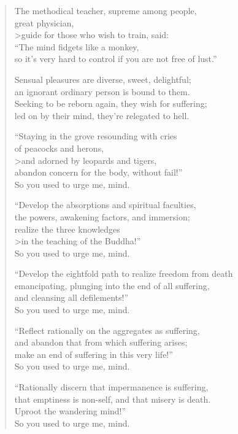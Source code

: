 \documentclass[12pt,openany]{book}%
\begin{document}
\begin{verse}
The methodical teacher, supreme among people, \\
great physician, \\>guide for those who wish to train, said: \\
“The mind fidgets like a monkey, \\
so it’s very hard to control if you are not free of lust.” 

Sensual pleasures are diverse, sweet, delightful; \\
an ignorant ordinary person is bound to them. \\
Seeking to be reborn again, they wish for suffering; \\
led on by their mind, they’re relegated to hell. 

“Staying in the grove resounding with cries \\
of peacocks and herons, \\>and adorned by leopards and tigers, \\
abandon concern for the body, without fail!” \\
So you used to urge me, mind. 

“Develop the absorptions and spiritual faculties, \\
the powers, awakening factors, and immersion; \\
realize the three knowledges \\>in the teaching of the Buddha!” \\
So you used to urge me, mind. 

“Develop the eightfold path to realize freedom from death \\
emancipating, plunging into the end of all suffering, \\
and cleansing all defilements!” \\
So you used to urge me, mind. 

“Reflect rationally on the aggregates as suffering, \\
and abandon that from which suffering arises; \\
make an end of suffering in this very life!” \\
So you used to urge me, mind. 

“Rationally discern that impermanence is suffering, \\
that emptiness is non-self, and that misery is death. \\
Uproot the wandering mind!” \\
So you used to urge me, mind. 


\end{verse}
\end{document}
